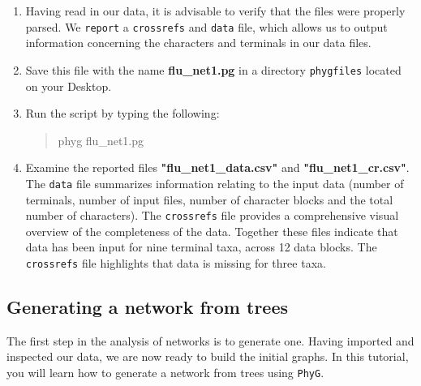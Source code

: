 \documentclass[11pt]{article}
\begin{document}
\begin{enumerate}
\item Having read in our data, it is advisable to verify that the files were properly 
parsed. We \texttt{report} a \texttt{crossrefs} and \texttt{data} file, which allows us
to output information concerning the characters and terminals in our data files. 

\item Save this file with the name \textbf{flu\_net1.pg} in a directory \texttt{phygfiles} 
located on your Desktop.

\item Run the script by typing the following:

	\begin{quote}
  	phyg flu\_net1.pg
	\end{quote}

\item Examine the reported files \textbf{"flu\_net1\_data.csv"} and 
\textbf{"flu\_net1\_cr.csv"}. The \texttt{data} file summarizes information 
relating to the input data (number of terminals, number of input files, number of 
character blocks and the total number of characters). The \texttt{crossrefs} file
provides a comprehensive visual overview of the completeness of the data. Together
these files indicate that data has been input for nine terminal taxa, across 12 data 
blocks. The \texttt{crossrefs} file highlights that data is missing for three taxa.
\end{enumerate}

\subsection{Generating a network from trees}
\label{subsec:makinganetwork}

The first step in the analysis of networks is to generate one. Having imported and 
inspected our data, we are now ready to build the initial graphs. In this tutorial, you 
will learn how to generate a network from trees using \texttt{PhyG}. 
\end{document}
